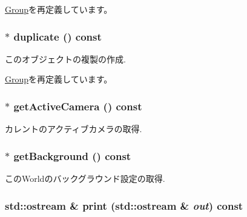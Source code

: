 \hyperlink{classm3g_1_1Group_8aad1ceab4c2a03609c8a42324ce484d}{Group}を再定義しています。\hypertarget{classm3g_1_1World_efde97aaf753d48fff769d9011f187f2}{
\subsubsection[{duplicate}]{ $\ast$ duplicate () const}}
\label{classm3g_1_1World_efde97aaf753d48fff769d9011f187f2}


このオブジェクトの複製の作成. 

\hyperlink{classm3g_1_1Group_1212dbd493e73180a6204874bd97df6b}{Group}を再定義しています。\hypertarget{classm3g_1_1World_812e01ec4fd0fd872b0ca5ea6a30b2f6}{
\subsubsection[{getActiveCamera}]{ $\ast$ getActiveCamera () const}}
\label{classm3g_1_1World_812e01ec4fd0fd872b0ca5ea6a30b2f6}


カレントのアクティブカメラの取得. \hypertarget{classm3g_1_1World_fb10ab7fd2ad14b7b1d49caf129670e0}{
\subsubsection[{getBackground}]{ $\ast$ getBackground () const}}
\label{classm3g_1_1World_fb10ab7fd2ad14b7b1d49caf129670e0}


このWorldのバックグラウンド設定の取得. \hypertarget{classm3g_1_1World_6fea17fa1532df3794f8cb39cb4f911f}{
\subsubsection[{print}]{\setlength{\rightskip}{0pt plus 5cm}std::ostream \& print (std::ostream \& {\em out}) const}}
\label{classm3g_1_1World_6fea17fa1532df3794f8cb39cb4f911f}


